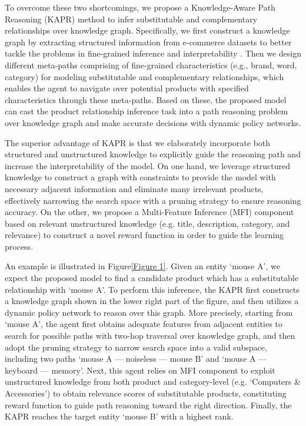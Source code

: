 \documentclass[review]{elsarticle}
\begin{document}
\begin{sloppypar}
To overcome these two shortcomings, we propose a Knowledge-Aware Path Reasoning (KAPR) method to infer substitutable and complementary relationships over knowledge graph. Specifically, we first construct a knowledge graph by extracting structured information from e-commerce datasets to better tackle  the problems in fine-grained inference and interpretability \cite{he2016ups_dataset}. Then we design different meta-paths comprising of fine-grained characteristics (e.g., brand, word, category) for modeling substitutable and complementary relationships, which enables the agent to navigate over potential products with specified characteristics through these meta-paths. Based on these, the proposed model can cast the product relationship inference task into a path reasoning problem over knowledge graph and make accurate decisions with dynamic policy networks. 

The superior advantage of KAPR is that we elaborately incorporate both structured and unstructured knowledge to explicitly guide the reasoning path and increase the interpretability of  the model. On one hand, we leverage structured knowledge to construct a graph with constraints to provide the model with necessary adjacent information and eliminate many irrelevant products, effectively narrowing the search space with a pruning strategy to ensure reasoning accuracy. On the other, we propose a Multi-Feature Inference (MFI) component  based on relevant unstructured knowledge (e.g. title, description, category, and  relevance) to construct a novel reward function in order to guide the learning process.  

An example is illustrated in Figure\ref{Figure 1}. Given an entity `mouse A', we expect the proposed model to find a candidate product which has a substitutable relationship with `mouse A'.  To perform this inference, the KAPR first constructs a knowledge graph shown in the lower right part of the figure, and then utilizes a dynamic policy network to 
reason over this graph. More precisely, starting from `mouse A', the agent first obtains adequate features from adjacent entities to search for possible paths with two-hop traversal over knowledge graph, and then adopt the pruning strategy to narrow  search space into a valid subspace, including two paths `mouse A — noiseless — mouse B' and `mouse A — keyboard — memory'. Next, this agent relies on MFI component to exploit unstructured knowledge from both product and category-level  (e.g. `Computers \& Accessories') to obtain relevance scores of substitutable products, constituting  reward function to guide path reasoning toward the right direction. Finally, the KAPR  reaches  the target entity `mouse B'  with a highest rank. 


\end{sloppypar}
\end{document}
